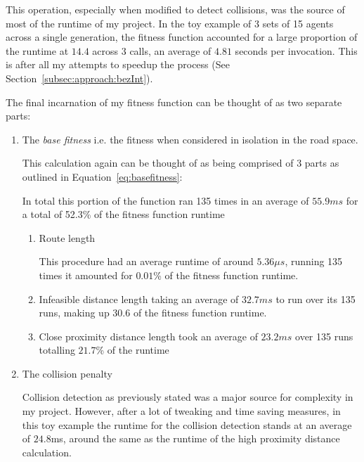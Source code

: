This operation, especially when modified to detect collisions, was the source of most of the runtime of my project. In the toy example of 3 sets of 15 agents across a single generation, the fitness function accounted for a large proportion of the runtime at $14.4$ across 3 calls, an average of $4.81$ seconds per invocation. This is after all my attempts to speedup the process (See Section~\ref{subsec:approach:bezInt}).

The final incarnation of my fitness function can be thought of as two separate parts:

\begin{enumerate}
  \item The \textit{base fitness} i.e. the fitness when considered in isolation in the road space.

        This calculation again can be thought of as being comprised of 3 parts as outlined in Equation~\ref{eq:basefitness}:

        In total this portion of the function ran 135 times in an average of $55.9ms$ for a total of 52.3\% of the fitness function runtime

        \begin{enumerate}
          \item Route length

                This procedure had an average runtime of around $5.36\mu s$, running 135 times it amounted for $0.01$\% of the fitness function runtime.

          \item Infeasible distance length taking an average of $32.7ms$ to run over its 135 runs, making up $30.6$ of the fitness function runtime.
          \item Close proximity distance length took an average of $23.2ms$ over 135 runs totalling $21.7$\% of the runtime

        \end{enumerate}


  \item The collision penalty

        Collision detection as previously stated was a major source for complexity in my project. However, after a lot of tweaking and time saving measures, in this toy example the runtime for the collision detection stands at an average of $24.8$ms, around the same as the runtime of the high proximity distance calculation.
\end{enumerate}



